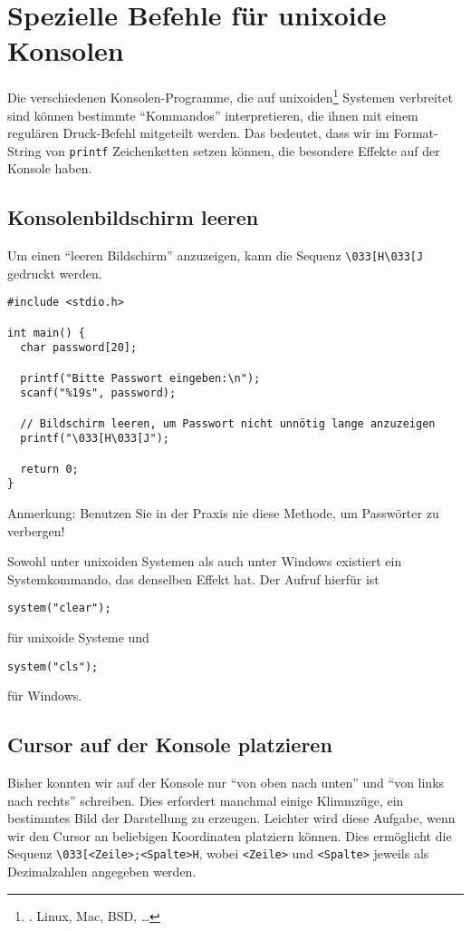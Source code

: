 \section{Spezielle Befehle für unixoide Konsolen}
Die verschiedenen Konsolen-Programme, die auf unixoiden\footnote{\ie. Linux, Mac, BSD, \ldots}  Systemen verbreitet sind können bestimmte \enquote{Kommandos} interpretieren, die ihnen mit einem regulären Druck-Befehl mitgeteilt werden. Das bedeutet, dass wir im Format-String von \texttt{printf} Zeichenketten setzen können, die besondere Effekte auf der Konsole haben.

\subsection{Konsolenbildschirm leeren}
Um einen \enquote{leeren Bildschirm} anzuzeigen, kann die Sequenz \texttt{\textbackslash 033[H\textbackslash 033[J} gedruckt werden.

\begin{codebox}
\begin{verbatim}
#include <stdio.h>

int main() {
  char password[20];

  printf("Bitte Passwort eingeben:\n");
  scanf("%19s", password);

  // Bildschirm leeren, um Passwort nicht unnötig lange anzuzeigen
  printf("\033[H\033[J");

  return 0;
}
\end{verbatim}
{\normalfont Anmerkung: Benutzen Sie in der Praxis nie diese Methode, um Passwörter zu verbergen!}
\end{codebox}

\begin{hintbox}
Sowohl unter unixoiden Systemen als auch unter Windows existiert ein Systemkommando, das denselben Effekt hat. Der Aufruf hierfür ist
\begin{center}
	\texttt{system("clear");}
\end{center}
für unixoide Systeme und
\begin{center}
	\texttt{system("cls");}
\end{center}
für Windows.
\end{hintbox}

\subsection{Cursor auf der Konsole platzieren}
Bisher konnten wir auf der Konsole nur \enquote{von oben nach unten} und \enquote{von links nach rechts} schreiben. Dies erfordert manchmal einige Klimmzüge, ein bestimmtes Bild der Darstellung zu erzeugen. Leichter wird diese Aufgabe, wenn wir den Cursor an beliebigen Koordinaten platziern können. Dies ermöglicht die Sequenz \texttt{\textbackslash 033[<Zeile>;<Spalte>H}, wobei \texttt{<Zeile>} und \texttt{<Spalte>} jeweils als Dezimalzahlen angegeben werden.

